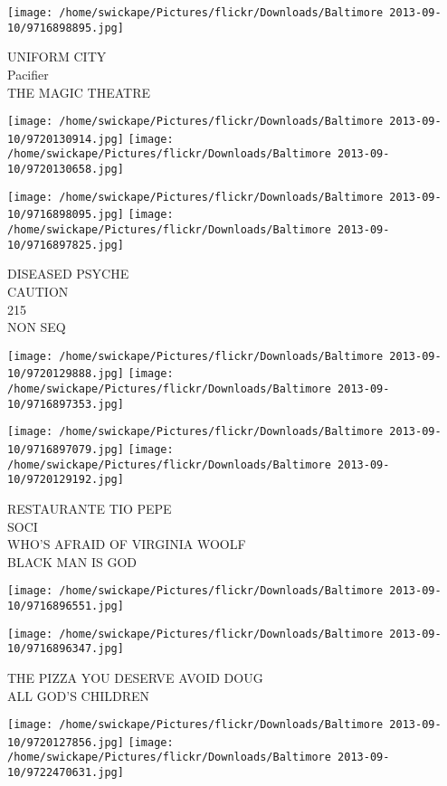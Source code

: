 \documentclass[10pt,letterpaper]{article}
\begin{document}
\vspace{0.25in}
\texttt{[image: /home/swickape/Pictures/flickr/Downloads/Baltimore 2013-09-10/9716898895.jpg]}

UNIFORM CITY\\
Pacifier\\
THE MAGIC THEATRE
\pagebreak

\texttt{[image: /home/swickape/Pictures/flickr/Downloads/Baltimore 2013-09-10/9720130914.jpg]}
\texttt{[image: /home/swickape/Pictures/flickr/Downloads/Baltimore 2013-09-10/9720130658.jpg]}

\texttt{[image: /home/swickape/Pictures/flickr/Downloads/Baltimore 2013-09-10/9716898095.jpg]}
\texttt{[image: /home/swickape/Pictures/flickr/Downloads/Baltimore 2013-09-10/9716897825.jpg]}

DISEASED PSYCHE\\
CAUTION\\
215\\
NON SEQ
\pagebreak

\texttt{[image: /home/swickape/Pictures/flickr/Downloads/Baltimore 2013-09-10/9720129888.jpg]}
\texttt{[image: /home/swickape/Pictures/flickr/Downloads/Baltimore 2013-09-10/9716897353.jpg]}

\texttt{[image: /home/swickape/Pictures/flickr/Downloads/Baltimore 2013-09-10/9716897079.jpg]}
\texttt{[image: /home/swickape/Pictures/flickr/Downloads/Baltimore 2013-09-10/9720129192.jpg]}

RESTAURANTE TIO PEPE\\
SOCI\\
WHO'S AFRAID OF VIRGINIA WOOLF\\
BLACK MAN IS GOD
\pagebreak

\texttt{[image: /home/swickape/Pictures/flickr/Downloads/Baltimore 2013-09-10/9716896551.jpg]}

\vspace{0.25in}
\texttt{[image: /home/swickape/Pictures/flickr/Downloads/Baltimore 2013-09-10/9716896347.jpg]}

THE PIZZA YOU DESERVE AVOID DOUG\\
ALL GOD'S CHILDREN
\pagebreak

\texttt{[image: /home/swickape/Pictures/flickr/Downloads/Baltimore 2013-09-10/9720127856.jpg]}
\texttt{[image: /home/swickape/Pictures/flickr/Downloads/Baltimore 2013-09-10/9722470631.jpg]}
\end{document}
